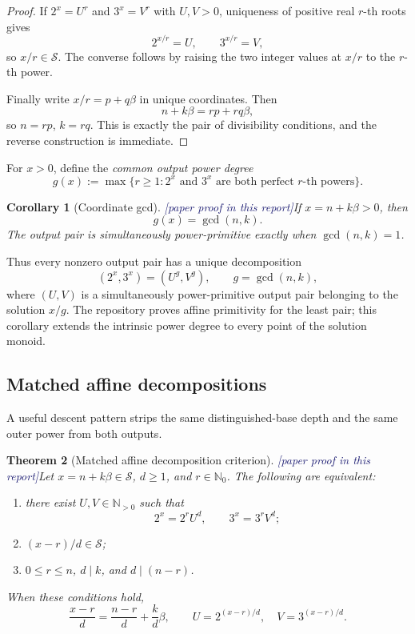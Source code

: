 \documentclass[11pt,oneside]{article}
\newtheorem{theorem}{Theorem}[section]
\newtheorem{corollary}[theorem]{Corollary}
\theoremstyle{definition}
\newcommand{\N}{\mathbb N}
\newcommand{\Nzero}{\mathbb N_0}
\newcommand{\Sol}{\mathcal S}
\newcommand{\tagPaper}{\textcolor{MidnightBlue}{\textsf{[paper proof in this report]}}}
\begin{document}
\begin{proof}
If \(2^x=U^r\) and \(3^x=V^r\) with \(U,V>0\), uniqueness of positive real
\(r\)-th roots gives
\[
  2^{x/r}=U,
  \qquad 3^{x/r}=V,
\]
so \(x/r\in\Sol\).  The converse follows by raising the two integer values at \(x/r\)
to the \(r\)-th power.

Finally write \(x/r=p+q\beta\) in unique coordinates.  Then
\[
  n+k\beta=rp+rq\beta,
\]
so \(n=rp\), \(k=rq\).  This is exactly the pair of divisibility conditions, and the
reverse construction is immediate.
\end{proof}

For \(x>0\), define the \emph{common output power degree}
\[
  g(x):=\max\{r\ge1:2^x\text{ and }3^x\text{ are both perfect }r\text{-th powers}\}.
\]

\begin{corollary}[Coordinate gcd]\label{cor:gcd-degree}
\tagPaper If \(x=n+k\beta>0\), then
\[
  \boxed{\quad g(x)=\gcd(n,k).\quad}
\]
The output pair is simultaneously power-primitive exactly when \(\gcd(n,k)=1\).
\end{corollary}

Thus every nonzero output pair has a unique decomposition
\[
  (2^x,3^x)=(U^g,V^g),
  \qquad g=\gcd(n,k),
\]
where \((U,V)\) is a simultaneously power-primitive output pair belonging to the solution
\(x/g\).  The repository proves affine primitivity for the least pair; this corollary
extends the intrinsic power degree to every point of the solution monoid.

\subsection{Matched affine decompositions}

A useful descent pattern strips the same distinguished-base depth and the same outer power
from both outputs.

\begin{theorem}[Matched affine decomposition criterion]\label{thm:affine-decomp}
\tagPaper Let \(x=n+k\beta\in\Sol\), \(d\ge1\), and \(r\in\Nzero\).  The following
are equivalent:
\begin{enumerate}[label=\textup{(\roman*)}]
\item there exist \(U,V\in\N_{>0}\) such that
\[
  2^x=2^rU^d,
  \qquad 3^x=3^rV^d;
\]
\item \((x-r)/d\in\Sol\);
\item \(0\le r\le n\), \(d\mid k\), and \(d\mid(n-r)\).
\end{enumerate}
When these conditions hold,
\[
  \frac{x-r}{d}=\frac{n-r}{d}+\frac{k}{d}\beta,
  \qquad
  U=2^{(x-r)/d},\quad V=3^{(x-r)/d}.
\]
\end{theorem}
\end{document}
